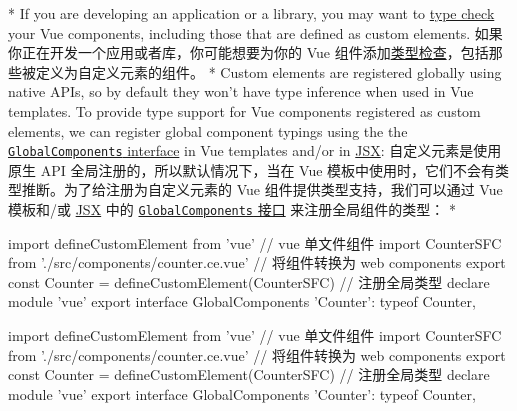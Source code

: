 \begin{paracol}{2} 
 
\switchcolumn[0]*%
If you are developing an application or a library, you may want to
\href{https://vuejs.org/guide/scaling-up/tooling.html\#typescript}{type
check} your Vue components, including those that are defined as custom
elements.
\switchcolumn
如果你正在开发一个应用或者库，你可能想要为你的 Vue
组件添加\href{https://cn.vuejs.org/guide/scaling-up/tooling.html\#typescript}{类型检查}，包括那些被定义为自定义元素的组件。
\switchcolumn[0]*%
Custom elements are registered globally using native APIs, so by default
they won't have type inference when used in Vue templates. To provide
type support for Vue components registered as custom elements, we can
register global component typings using the the
\href{https://github.com/vuejs/language-tools/blob/master/packages/vscode-vue/README.md\#usage}{\texttt{GlobalComponents}
interface} in Vue templates and/or in
\href{https://www.typescriptlang.org/docs/handbook/jsx.html\#intrinsic-elements}{JSX}:
\switchcolumn
自定义元素是使用原生 API 全局注册的，所以默认情况下，当在 Vue
模板中使用时，它们不会有类型推断。为了给注册为自定义元素的 Vue
组件提供类型支持，我们可以通过 Vue 模板和/或
\href{https://www.typescriptlang.org/docs/handbook/jsx.html\#intrinsic-elements}{JSX}
中的
\href{https://github.com/vuejs/language-tools/blob/master/packages/vscode-vue/README.md\#usage}{\texttt{GlobalComponents}
接口} 来注册全局组件的类型：
\switchcolumn[0]*%
\begin{codeHtml}
import { defineCustomElement } from 'vue'
// vue 单文件组件
import CounterSFC from './src/components/counter.ce.vue'
// 将组件转换为 web components
export const Counter = defineCustomElement(CounterSFC)
// 注册全局类型
declare module 'vue' {
  export interface GlobalComponents {
    'Counter': typeof Counter,
  }
}
\end{codeHtml}
\switchcolumn
\begin{codeHtml}
import { defineCustomElement } from 'vue'
// vue 单文件组件
import CounterSFC from './src/components/counter.ce.vue'
// 将组件转换为 web components
export const Counter = defineCustomElement(CounterSFC)
// 注册全局类型
declare module 'vue' {
  export interface GlobalComponents {
    'Counter': typeof Counter,
  }
}
\end{codeHtml}
\end{paracol}



